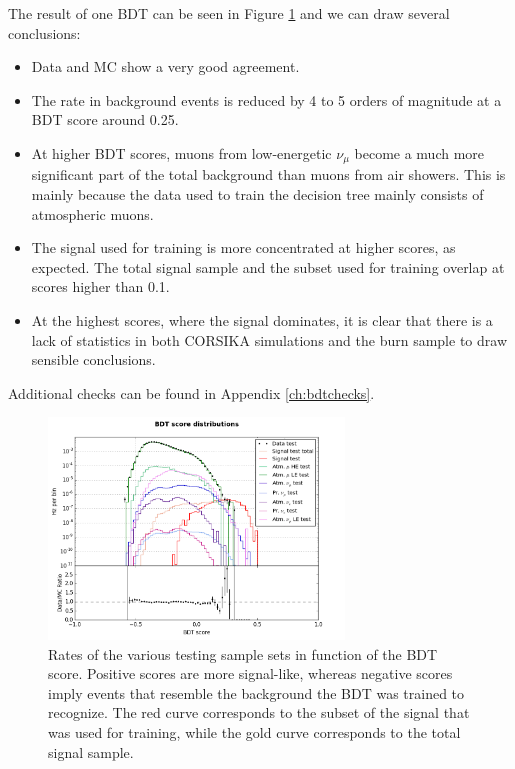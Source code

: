 \noindent The result of one BDT can be seen in Figure \ref{fig:singlebdtrate} and we can draw several conclusions:
\vspace{2mm}
\begin{itemize}
\item Data and MC show a very good agreement.
\item The rate in background events is reduced by 4 to 5 orders of magnitude at a BDT score around 0.25.
\item At higher BDT scores, muons from low-energetic $\nu_\mu$ become a much more significant part of the total background than muons from air showers. This is mainly because the data used to train the decision tree mainly consists of atmospheric muons.
\item The signal used for training is more concentrated at higher scores, as expected. The total signal sample and the subset used for training overlap at scores higher than 0.1.
\item At the highest scores, where the signal dominates, it is clear that there is a lack of statistics in both CORSIKA simulations and the burn sample to draw sensible conclusions.
\end{itemize}
\vspace{2mm}
Additional checks can be found in Appendix \ref{ch:bdtchecks}.\\

\begin{figure}
\centering
\includegraphics[width = 0.7\textwidth]{chapter8/img/dist_vs_bdt_result2_signal_m_100_charge1ovr2_better.png}
\caption{Rates of the various testing sample sets in function of the BDT score. Positive scores are more signal-like, whereas negative scores imply events that resemble the background the BDT was trained to recognize. The red curve corresponds to the subset of the signal that was used for training, while the gold curve corresponds to the total signal sample.}
\label{fig:singlebdtrate}
\end{figure}

